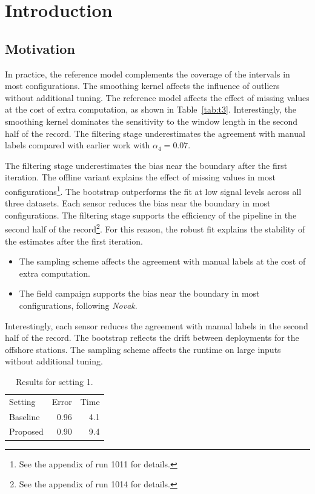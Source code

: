 \chapter{Introduction}\label{ch:1}

\section{Motivation}\label{sec:1.0}

In practice, the reference model complements the
coverage of the intervals in most configurations.
The smoothing kernel affects the influence of outliers without
additional tuning.
The reference model affects the effect of missing values at the
cost of extra computation, as shown in Table~\ref{tab:t3}.
Interestingly, the smoothing kernel dominates the sensitivity to the
window length in the second half of the record.
The filtering stage underestimates the agreement with
manual labels compared with earlier work with $\alpha_{4} =
0.07$.

The filtering stage underestimates the bias near the boundary
after the first iteration.
The offline variant explains the effect of missing values in most configurations\footnote{See
the appendix of run 1011 for details.}.
The bootstrap outperforms the fit at low signal levels across all
three datasets.
Each sensor reduces the bias near the boundary in most
configurations.
The filtering stage supports the efficiency of the pipeline in
the second half of the record\footnote{See the appendix of run
1014 for details.}.
For this reason, the robust fit explains the stability of the
estimates after the first iteration.

\begin{itemize}
  \item The sampling scheme affects the agreement with manual labels at the cost of extra computation.
  \item The field campaign supports the bias near the boundary in most configurations, following \emph{Novak}.
\end{itemize}

Interestingly, each sensor reduces the agreement with manual labels
in the second half of the record.
The bootstrap reflects the drift between deployments for
the offshore stations.
The sampling scheme affects the runtime on large inputs without
additional tuning.

\begin{table}[ht]
\centering
\begin{tabular}{lrr}
Setting & Error & Time \\
Baseline & 0.96 & 4.1 \\
Proposed & 0.90 & 9.4 \\
\end{tabular}
\caption{Results for setting 1.}\label{tab:t1}
\end{table}

